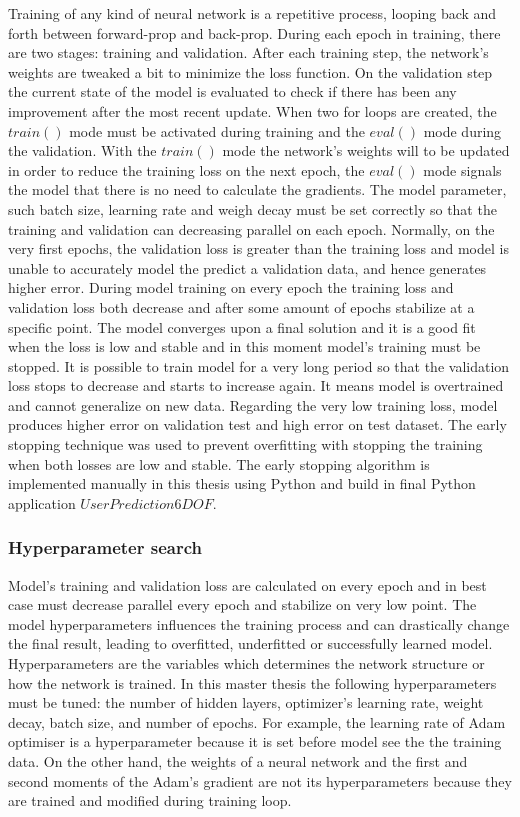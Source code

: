 Training of any kind of neural network is a repetitive process, looping back and forth between forward-prop and back-prop. During each epoch in training, there are two stages: training and validation. After each training step, the network’s weights are tweaked a bit to minimize the loss function. On the validation step the current state of the model is evaluated to check if there has been any improvement after the most recent update. When two for loops are created, the $train()$ mode must be activated during training and the $eval()$ mode during the validation. With the $train()$ mode the network’s weights will to be updated in order to reduce the training loss on the next epoch, the $eval()$ mode signals the model that there is no need to calculate the gradients. The model parameter, such batch size, learning rate and weigh decay must be set correctly so that the training and validation can decreasing parallel on each epoch. Normally, on the very first epochs, the validation loss is greater than the training loss and model is unable to accurately model the predict a validation data, and hence generates higher error. During model training on every epoch the training loss and validation loss both decrease and after some amount of epochs stabilize at a specific point. The model converges upon a final solution and it is a good fit when the loss is low and stable and in this moment model's training must be stopped. It is possible to train model for a very long period so that the validation loss stops to decrease and starts to increase again. It means model is overtrained and cannot generalize on new data. Regarding the very low training loss, model produces higher error on validation test and high error on test dataset. The early stopping technique was used to prevent overfitting with stopping the training when both losses are low and stable. The early stopping algorithm is implemented manually in this thesis using Python and build in final Python application $UserPrediction6DOF$.

\subsubsection{Hyperparameter search}
\label{sec:impl:model:dev:search}
Model's training and validation loss are calculated on every epoch and in best case must decrease parallel every epoch and stabilize on very low point. The model hyperparameters influences the training process and can drastically change the final result, leading to overfitted, underfitted or successfully learned model. Hyperparameters are the variables which determines the network structure or how the network is trained. In this master thesis the following hyperparameters must be tuned: the number of hidden layers, optimizer's learning rate, weight decay, batch size, and number of epochs. For example, the learning rate of Adam optimiser is a hyperparameter because it is set before model see the the training data. On the other hand, the weights of a neural network and the first and second moments of the Adam's gradient are not its hyperparameters because they are trained and modified during training loop.

